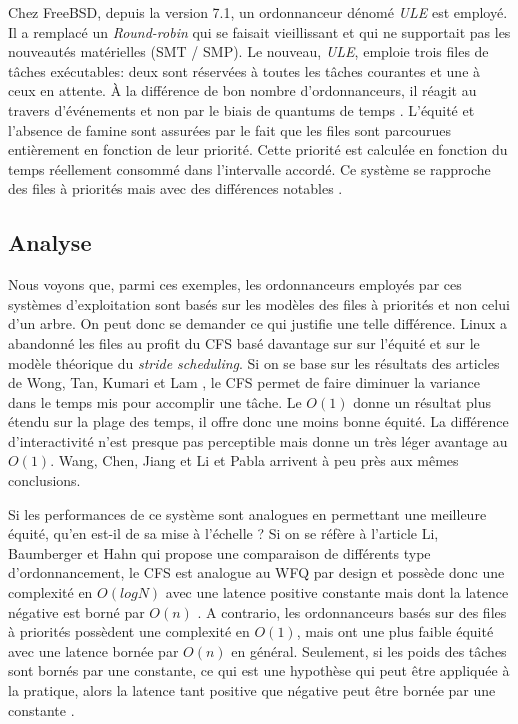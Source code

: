 \documentclass[letterpaper]{article}
\begin{document}
Chez FreeBSD, depuis la version 7.1, un ordonnanceur dénomé \textit{ULE} est employé. Il a remplacé un \textit{Round-robin} qui se faisait vieillissant et qui ne supportait pas les nouveautés matérielles (SMT / SMP). Le nouveau, \textit{ULE}, emploie trois files de tâches exécutables: deux sont réservées à toutes les tâches courantes et une à ceux en attente. À la différence de bon nombre d'ordonnanceurs, il réagit au travers d'événements et non par le biais de quantums de temps \citep{roberson2003ule}. L'équité et l'absence de famine sont assurées par le fait que les files sont parcourues entièrement en fonction de leur priorité. Cette priorité est calculée en fonction du temps réellement consommé dans l'intervalle accordé. Ce système se rapproche des files à priorités mais avec des différences notables \citep{mckusick2014design}.

\subsection{Analyse}

Nous voyons que, parmi ces exemples, les ordonnanceurs employés par ces systèmes d'exploitation sont basés sur les modèles des files à priorités et non celui d'un arbre. On peut donc se demander ce qui justifie une telle différence. Linux a abandonné les files au profit du CFS basé davantage sur sur l'équité et sur le modèle théorique du \textit{stride scheduling}. Si on se base sur les résultats des articles de Wong, Tan, Kumari et Lam \citep{4631872, Wong:2008:TAF:1400097.1400102}, le CFS permet de faire diminuer la variance dans le temps mis pour accomplir une tâche. Le $O(1)$ donne un résultat plus étendu sur la plage des temps, il offre donc une moins bonne équité. La différence d'interactivité n'est presque pas perceptible mais donne un très léger avantage au $O(1)$. Wang, Chen, Jiang et Li \citep{5279631} et Pabla \citep{Pabla:2009:CFS:1594371.1594375} arrivent à peu près aux mêmes conclusions.

Si les performances de ce système sont analogues en permettant une meilleure équité, qu'en est-il de sa mise à l'échelle ? Si on se réfère à l'article Li, Baumberger et Hahn \citep{li2009efficient} qui propose une comparaison de différents type d'ordonnancement, le CFS est analogue au WFQ par design et possède donc une complexité en $O(log N)$ avec une latence positive constante mais dont la latence négative est borné par $O(n)$ \citep{234856}. A contrario, les ordonnanceurs basés sur des files à priorités possèdent une complexité en $O(1)$, mais ont une plus faible équité avec une latence bornée par $O(n)$ en général. Seulement, si les poids des tâches sont bornés par une constante, ce qui est une hypothèse qui peut être appliquée à la pratique, alors la latence tant positive que négative peut être bornée par une constante \citep{Shreedhar:1995:EFQ:217391.217453}.
\end{document}
